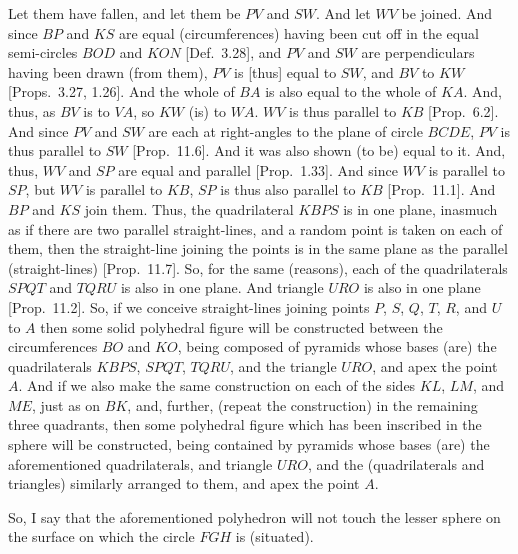 \begin{Parallel}{}{}
{Let them have fallen, and let them be $PV$ and $SW$.  And let $WV$ be joined.  And since  $BP$ and
$KS$ are equal (circumferences) having been cut off  in the equal semi-circles $BOD$ and $KON$ [Def.~3.28], and  $PV$ and $SW$ are
perpendiculars having been drawn (from them), $PV$ is [thus] equal to $SW$, and $BV$ to $KW$ [Props.~3.27, 1.26]. And the whole of
$BA$ is also equal to the whole of $KA$. And, thus, as $BV$ is to $VA$, so $KW$ (is) to $WA$. 
$WV$ is thus parallel to $KB$ [Prop.~6.2]. And since $PV$ and $SW$ are each at right-angles to the plane
of circle $BCDE$,  $PV$ is thus parallel to $SW$ [Prop.~11.6]. And it was also shown (to be) equal to it.
And, thus, $WV$ and $SP$ are equal and parallel [Prop.~1.33]. And since $WV$ is parallel to $SP$,
but $WV$ is parallel to $KB$, $SP$ is thus also parallel to $KB$ [Prop.~11.1]. And  $BP$ and
$KS$ join them. Thus, the quadrilateral $KBPS$ is in one plane, inasmuch as if there are two parallel
straight-lines, and a random point is taken on each of them, then the straight-line joining the points is in the same plane as
the parallel (straight-lines) [Prop.~11.7]. So, for the same (reasons), each of the quadrilaterals
$SPQT$ and $TQRU$ is also in one plane. And triangle $URO$ is also in one plane [Prop.~11.2].
So, if we conceive straight-lines joining points $P$, $S$, $Q$, $T$, $R$,
and $U$ to $A$ then some solid polyhedral  figure will be constructed between the circumferences $BO$ and $KO$,
being composed of pyramids whose bases (are) the quadrilaterals $KBPS$, $SPQT$, $TQRU$, and the triangle $URO$, 
and apex the point $A$. And if we also make the same construction on each of the sides $KL$, $LM$, and $ME$, just as on $BK$, 
and, further, (repeat the construction) in the remaining three quadrants, then some polyhedral figure
which has been inscribed in the sphere will be constructed, being contained by pyramids whose bases (are) the
aforementioned quadrilaterals, and triangle $URO$, and the (quadrilaterals and triangles) similarly arranged
to them, and apex the point $A$.

So, I say that the aforementioned polyhedron  will not touch the lesser sphere on the surface on which  the circle $FGH$ is (situated).

}
\end{Parallel}
